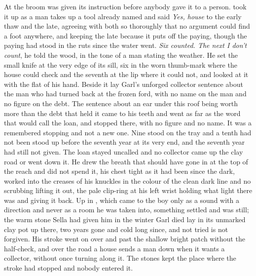At  the broom was given its instruction before anybody gave it to a person.  took it up as a man takes up a tool already named and said \emph{Yes, house} to the early thaw and the late, agreeing with both so thoroughly that no argument could find a foot anywhere, and keeping the late because it puts off the paying, though the paying had stood in the ruts since the water went. \emph{Six counted. The next I don't count}, he told the wood, in the tone of a man stating the weather. He set the small knife at the very edge of its sill, six in the worn thumb-mark where the house could check and the seventh at the lip where it could not, and looked at it with the flat of his hand. Beside it lay Garl's unforged collector sentence about the man who had turned back at the frozen ford, with no name on the man and no figure on the debt. The sentence about an ear under this roof being worth more than the debt that held it came to his teeth and went as far as the word that would call the loan, and stopped there, with no figure and no name. It was a remembered stopping and not a new one. Nine stood on the tray and a tenth had not been stood up before the seventh year at its very end, and the seventh year had still not given. The loan stayed uncalled and no collector came up the clay road or went down it. He drew the breath that should have gone in at the top of the reach and did not spend it, his chest tight as it had been since the dark,  worked into the creases of his knuckles in the colour of the clean dark line and no scrubbing lifting it out, the pale clip-ring at his left wrist holding what light there was and giving it back. Up in , which came to the boy only as a sound with a direction and never as a room he was taken into, something settled and was still; the warm stone Sella had given him in the winter Garl died lay in its unmarked clay pot up there, two years gone and cold long since, and not tried is not forgiven. His stroke went on over  and past the shallow bright patch without the half-check, and over the road a house sends a man down when it wants a collector, without once turning along it. The stones kept the place where the stroke had stopped and nobody entered it.

